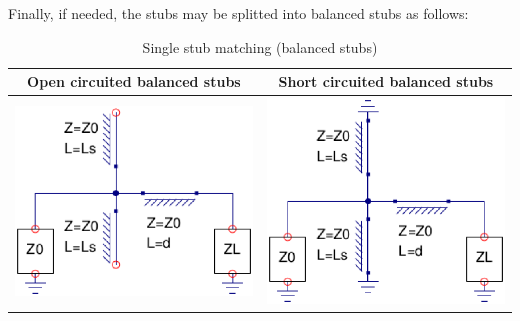 \noindent Finally, if needed, the stubs may be splitted into balanced stubs as follows:

\begin{table}[H]
  \centering
  \begin{tabular}{ | c | c | }
    \hline
    Open circuited balanced stubs & Short circuited balanced stubs\\ \hline
    \begin{minipage}{.4\textwidth}
      \includegraphics[width=\linewidth]{./images/Synthesis/Impedance_Matching/SingleStubOpenBalanced}
    \end{minipage}
    &
    \begin{minipage}{.4\textwidth}
      \includegraphics[width=\linewidth]{./images/Synthesis/Impedance_Matching/SingleStubShortBalanced}
    \end{minipage}
    \\ \hline
  \end{tabular}
  \caption{Single stub matching (balanced stubs)}\label{tbl:sngstubbalanced}
\end{table}

